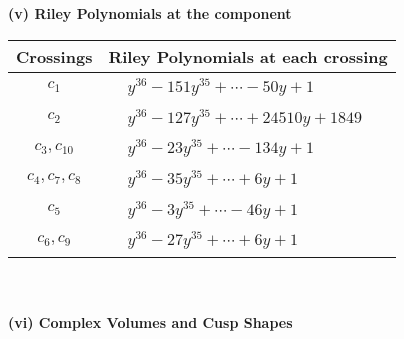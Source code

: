 \documentclass[1p]{elsarticle_modified}
\theoremstyle{definition}
\begin{document}
\newpage\renewcommand{\arraystretch}{1}
\flushleft \textbf{(v) Riley Polynomials at the component}\newline \\
\begin{tabular}{m{50pt}|m{274pt}}
Crossings & \hspace{64pt}Riley Polynomials at each crossing \\
\hline $$\begin{aligned}c_{1}\end{aligned}$$&$\begin{aligned}
&y^{36}-151 y^{35}+\cdots-50 y+1
\end{aligned}$\\
\hline $$\begin{aligned}c_{2}\end{aligned}$$&$\begin{aligned}
&y^{36}-127 y^{35}+\cdots+24510 y+1849
\end{aligned}$\\
\hline $$\begin{aligned}c_{3},c_{10}\end{aligned}$$&$\begin{aligned}
&y^{36}-23 y^{35}+\cdots-134 y+1
\end{aligned}$\\
\hline $$\begin{aligned}c_{4},c_{7},c_{8}\end{aligned}$$&$\begin{aligned}
&y^{36}-35 y^{35}+\cdots+6 y+1
\end{aligned}$\\
\hline $$\begin{aligned}c_{5}\end{aligned}$$&$\begin{aligned}
&y^{36}-3 y^{35}+\cdots-46 y+1
\end{aligned}$\\
\hline $$\begin{aligned}c_{6},c_{9}\end{aligned}$$&$\begin{aligned}
&y^{36}-27 y^{35}+\cdots+6 y+1
\end{aligned}$\\
\hline
\end{tabular}\\~\\
\newpage\flushleft \textbf{(vi) Complex Volumes and Cusp Shapes}
\end{document}
